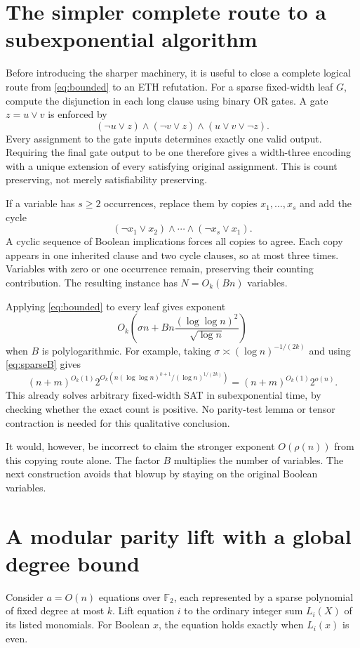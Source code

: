 \documentclass[11pt,a4paper]{article}
\numberwithin{equation}{section}
\theoremstyle{definition}
\theoremstyle{remark}
\newcommand{\F}{\mathbb F}
\begin{document}
\section{The simpler complete route to a subexponential algorithm}
\label{sec:simple}
Before introducing the sharper machinery, it is useful to close a complete
logical route from \eqref{eq:bounded} to an ETH refutation.
For a sparse fixed-width leaf $G$, compute the disjunction in each long clause
using binary OR gates. A gate $z=u\vee v$ is enforced by
\[
 (\neg u\vee z)\wedge(\neg v\vee z)\wedge(u\vee v\vee\neg z).
\]
Every assignment to the gate inputs determines exactly one valid output.
Requiring the final gate output to be one therefore gives a width-three
encoding with a unique extension of every satisfying original assignment.
This is count preserving, not merely satisfiability preserving.

If a variable has $s\ge2$ occurrences, replace them by copies
$x_1,\ldots,x_s$ and add the cycle
\[
 (\neg x_1\vee x_2)\wedge\cdots\wedge
 (\neg x_s\vee x_1).
\]
A cyclic sequence of Boolean implications forces all copies to agree. Each
copy appears in one inherited clause and two cycle clauses, so at most three
times. Variables with zero or one occurrence remain, preserving their counting
contribution. The resulting instance has $N=O_k(Bn)$ variables.

Applying \eqref{eq:bounded} to every leaf gives exponent
\[
 O_k\left(\sigma n+
       Bn\frac{(\log\log n)^2}{\sqrt{\log n}}\right)
\]
when $B$ is polylogarithmic. For example, taking
$\sigma\asymp(\log n)^{-1/(2k)}$ and using \eqref{eq:sparseB} gives
\begin{equation}\label{eq:simple-general}
 (n+m)^{O_k(1)}
 2^{O_k(n(\log\log n)^{k+1}/(\log n)^{1/(2k)})}
 =(n+m)^{O_k(1)}2^{o(n)}.
\end{equation}
This already solves arbitrary fixed-width SAT in subexponential time, by
checking whether the exact count is positive. No parity-test lemma or tensor
contraction is needed for this qualitative conclusion.

It would, however, be incorrect to claim the stronger exponent $O(\rho(n))$
from this copying route alone. The factor $B$ multiplies the number of variables.
The next construction avoids that blowup by staying on the original Boolean
variables.

\section{A modular parity lift with a global degree bound}
\label{sec:paritylift}
Consider $a=O(n)$ equations over $\F_2$, each represented by a sparse polynomial
of fixed degree at most $k$. Lift equation $i$ to the ordinary integer sum
$L_i(X)$ of its listed monomials. For Boolean $x$, the equation holds exactly
when $L_i(x)$ is even.
\end{document}
